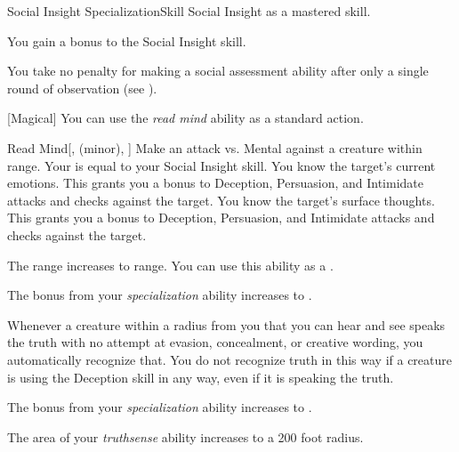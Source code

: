     \begin{feat}{Social Insight Specialization}{Skill}
        \featpre Social Insight as a mastered skill.

         You gain a  bonus to the Social Insight skill.

         You take no penalty for making a social assessment ability after only a single round of observation (see ).

        [Magical] You can use the \textit{read mind} ability as a standard action.
        \begin{freeability}{Read Mind}[,  (minor), ]
            Make an attack vs. Mental against a creature within \rngclose range.
            Your  is equal to your Social Insight skill.
            \hit You know the target's current emotions.
            This grants you a  bonus to Deception, Persuasion, and Intimidate attacks and checks against the target.
            \crit You know the target's surface thoughts.
            This grants you a  bonus to Deception, Persuasion, and Intimidate attacks and checks against the target.

            \rankline
             The range increases to \rnglong range.
             You can use this ability as a .
        \end{freeability}

         The bonus from your \textit{specialization} ability increases to .

         Whenever a creature within a \arealarge radius  from you that you can hear and see speaks the truth with no attempt at evasion, concealment, or creative wording, you automatically recognize that.
        You do not recognize truth in this way if a creature is using the Deception skill in any way, even if it is speaking the truth.

         The bonus from your \textit{specialization} ability increases to .

         The area of your \textit{truthsense} ability increases to a 200 foot radius.
    \end{feat}

